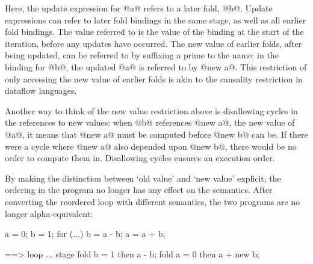 Here, the update expression for @a@ refers to a later fold, @b@.
Update expressions can refer to later fold bindings in the same stage, as well as all earlier fold bindings.
The value referred to is the value of the binding at the start of the iteration, before any updates have occurred.
The new value of earlier folds, after being updated, can be referred to by suffixing a prime to the name: in the binding for @b@, the updated @a@ is referred to by @new a@.
This restriction of only accessing the new value of earlier folds is akin to the causality restriction in dataflow languages\cite{mandel2010lucy}.

Another way to think of the new value restriction above is disallowing cycles in the references to new values:
when @b@ references @new a@, the new value of @a@, it means that @new a@ must be computed before @new b@ can be.
If there were a cycle where @new a@ also depended upon @new b@, there would be no order to compute them in.
Disallowing cycles ensures an execution order.

By making the distinction between `old value' and `new value' explicit, the ordering in the program no longer has any effect on the semantics.
After converting the reordered loop with different semantics, the two programs are no longer alpha-equivalent:
\begin{code}
a = 0;
b = 1;
for (...) {
  b = a - b;
  a = a + b;
}

==>
loop ... {
  stage {
    fold b = 1
        then a - b;
    fold a = 0
        then a + new b;
  }
}
\end{code}

